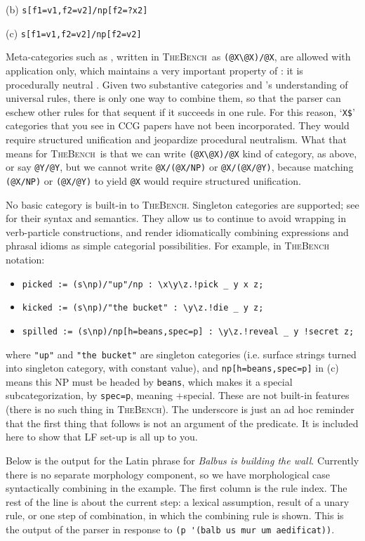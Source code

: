 \documentclass[11pt]{article}
\newcommand{\tool}{\textsc{TheBench}}
\begin{document}
(b) \verb|s[f1=v1,f2=v2]/np[f2=?x2]|

(c) \verb|s[f1=v1,f2=v2]/np[f2=v2]| 

 
\noindent Meta-categories such as , written in \tool\, as \verb+(@X\@X)/@X+, are allowed with application only,
which maintains a very important property of : it is procedurally neutral \citep{pareschisteedman87}. Given two substantive categories and 's understanding of universal rules, there is only one way to combine them,
so that the parser can eschew other rules for that sequent if it succeeds in one rule. For this reason, `\verb|X$|' categories that you see in CCG papers
have not been incorporated. They would require structured unification and jeopardize procedural neutralism. What that means for \tool\, is that
we can write \verb+(@X\@X)/@X+ kind of category, as above, or say \verb+@Y/@Y+, but we cannot write \verb+@X/(@X/NP)+ or \verb+@X/(@X/@Y)+, because
matching \verb+(@X/NP)+ or \verb+(@X/@Y)+ to yield \verb+@X+ would require structured unification.


No basic category is built-in to \tool.
{Singleton categories are  supported; see \cite{bozs:18} for their syntax and semantics. They allow us to continue to avoid wrapping in verb-particle
constructions, and render idiomatically combining expressions and phrasal idioms as simple categorial possibilities. For example, in \tool\, notation:}

\begin{itemize}
\item[(a)] \verb|picked := (s\np)/"up"/np : \x\y\z.!pick _ y x z;|
\item[(b)] \verb|kicked := (s\np)/"the bucket" : \y\z.!die _ y z;|
\item[(c)] \verb|spilled := (s\np)/np[h=beans,spec=p] : \y\z.!reveal _ y !secret z;|
\end{itemize}
{where} \verb|"up"| {and} \verb|"the bucket"| 
{are singleton categories (i.e. surface
strings turned into singleton category, with constant value), and} \verb|np[h=beans,spec=p]| 
{in (c) means
this NP must be headed by} \verb|beans|, {which makes it a special
subcategorization, by} \verb|spec=p|, {meaning $+$special. These are not built-in features (there is no such thing in \tool).
The underscore is just an ad hoc reminder that
the first thing that follows is not an argument of the predicate.
It is included here to show that LF set-up is all up to you.}

Below is the output for the Latin phrase for \emph{Balbus is building the wall}. 
{Currently there is no separate morphology component, so we have morphological case syntactically combining in the example.}
The first column is the rule index. 
The rest of the line is about the current step: a lexical assumption, result of a unary rule, or one step of combination, in which the combining rule is shown. This is the output of the parser in response to \verb+(p '(balb us mur um aedificat))+.
\end{document}
